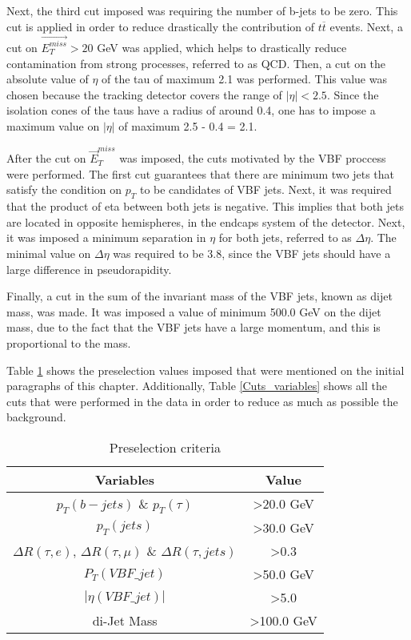 Next, the third cut imposed was requiring the number of b-jets to be zero. This cut is applied in order to reduce drastically the contribution of $t\overline{t}$ events. Next, a cut on $\vec{E_{T}^{miss}} > 20$ GeV was applied, which helps to drastically reduce contamination from strong processes, referred to as QCD. Then, a cut on the absolute value of $\eta$ of the tau of maximum 2.1 was performed. This value was chosen because the tracking detector covers the range of $|\eta|<2.5$. Since the isolation cones of the taus have a radius of around 0.4, one has to impose a maximum value on $|\eta|$ of maximum 2.5 - 0.4 = 2.1.
  
After the cut on $\vec{E}_T^{miss}$ was imposed, the cuts motivated by the VBF proccess were performed. The first cut guarantees that there are minimum two jets that satisfy the 
condition on $p_T$ to be candidates of VBF jets. Next, it was required that the product of eta between both jets is negative. This implies that both jets are located in opposite hemispheres,
in the endcaps system of the detector. Next, it was imposed a minimum separation in $\eta$ for both jets, referred to as $\Delta \eta$. The minimal value on $\Delta \eta$ was required 
to be 3.8, since the VBF jets should have a large difference in pseudorapidity. 


Finally, a cut in the sum of the invariant mass of the VBF jets, known as dijet mass, was made. It was imposed a value of minimum 500.0 GeV on the dijet mass, due to the fact that the VBF jets have a large momentum, and this is proportional to the mass.  

Table \ref{preselection_table} shows the preselection values imposed that were mentioned on the initial paragraphs of this chapter. Additionally, Table \ref{Cuts_variables} shows all 
the cuts that were performed in the data in order to reduce as much as possible the background. 

\begin{table}[h]
\centering
\caption{Preselection criteria}
\label{preselection_table}
\begin{tabular}{|c|c|}
\hline
Variables                                                                & Value                 \\ \hline
$p_T(b-jets)$ \& $p_T(\tau)$                                            & \textgreater 20.0 GeV \\ \hline
$p_T(jets)$                                                             & \textgreater 30.0 GeV  \\ \hline
$\Delta R (\tau, e)$, $\Delta R (\tau, \mu)$ \& $\Delta R (\tau, jets)$ & \textgreater 0.3      \\ \hline
$P_T(VBF\_jet)$                                                          & \textgreater 50.0 GeV \\ \hline
$|\eta(VBF\_jet)|$                                                         & \textgreater5.0       \\ \hline
di-Jet Mass                                                               & \textgreater100.0 GeV \\ \hline
\end{tabular}
\end{table}

